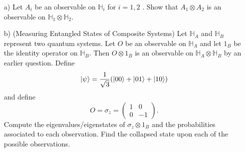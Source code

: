 \documentclass{article}
\renewcommand{\H}{\mathbb{H}}
\begin{document}
\begin{question}
    \begin{enumerate}
        \item[a)] Let $A_i$ be an observable on $\H_i$ for $i=1,2$ . Show that $A_1 \otimes A_2$ is an observable on $\H_1 \otimes \H_2.$
        \item[b)] (Measuring Entangled States of Composite Systems) Let $\H_A$ and $\H_B$ represent two quantum systems. Let $O$ be an observable on $\H_A$ and let $1_B$ be the identity operator on $\H_B$. Then $O \otimes 1_B$ is an observable on $\H_A \otimes \H_B$ by an earlier question. Define $$\ket{\psi}=\frac{1}{\sqrt{3}}(\ket{00}+\ket{01}+\ket{10})$$ and define $$O=\sigma_z=\begin{pmatrix}
            1 & 0\\
            0 & -1
        \end{pmatrix}.$$ Compute the eigenvalues/eigenstates of $\sigma_z \otimes 1_B$ and the probabilities associated to each observation. Find the collapsed state upon each of the possible observations.
    \end{enumerate}
\end{question}
\end{document}
